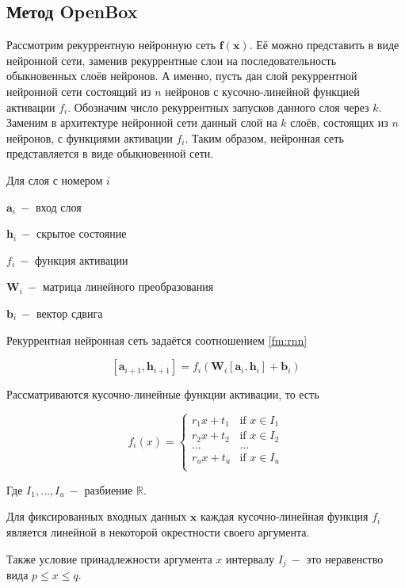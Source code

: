 \documentclass[a4paper, 12pt]{article}
\begin{document}
\subsection{Метод OpenBox}

Рассмотрим рекуррентную нейронную сеть $\mathbf{f}(\mathbf{x})$. Её можно представить в виде нейронной сети, заменив рекуррентные слои на последовательность обыкновенных слоёв нейронов. А именно, пусть дан слой рекуррентной нейронной сети состоящий из $n$ нейронов с кусочно-линейной функцией активации $f_i$. Обозначим число рекуррентных запусков данного слоя через $k$. Заменим в архитектуре нейронной сети данный слой на $k$ слоёв, состоящих из $n$ нейронов, с функциями активации $f_i$. Таким образом, нейронная сеть представляется в виде обыкновенной сети.

Для слоя с номером $i$

$\mathbf{a}_i~-$ вход слоя

$\mathbf{h}_i~-$ скрытое состояние

$f_i~-$ функция активации

$\mathbf{W}_i~-$ матрица линейного преобразования

$\mathbf{b}_i~-$ вектор сдвига

Рекуррентная нейронная сеть задаётся соотношением \eqref{fm:rnn}

\begin{equation}\label{fm:rnn}
[\mathbf{a}_{i+1}, \mathbf{h}_{i+1}]=f_i\left(\mathbf{W}_i [\mathbf{a}_{i},\mathbf{h}_i] + \mathbf{b}_i\right)
\end{equation}

Рассматриваются кусочно-линейные функции активации, то есть

\[f_i(x)=\left\{
\begin{array}{ll}
      r_1 x+t_1 & \text{if } x\in I_1 \\
      r_2 x+t_2 & \text{if } x\in I_2 \\
      \dots&\dots\\
      r_u x+t_u & \text{if } x\in I_u \\
\end{array} 
\right. \]

Где $I_1,\dots,I_u~-$ разбиение $\mathbb{R}$.

Для фиксированных входных данных $\mathbf{x}$ каждая кусочно-линейная функция $f_i$ является линейной в некоторой окрестности своего аргумента.

Также условие принадлежности аргумента $x$ интервалу $I_j~-$ это неравенство вида $p \leq x \leq q$.
\end{document}
